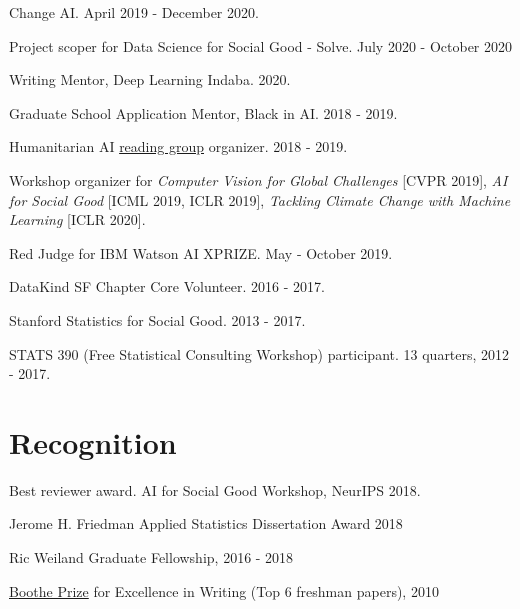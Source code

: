 \documentclass[letterpaper]{article}
\renewenvironment{itemize}{
  \begin{list}{}{
    \setlength{\leftmargin}{1.5em}
  }
}{
  \end{list}
}
\begin{document}
\begin{itemize}
{Change AI}. April 2019 - December 2020.
\item Project scoper for Data Science for Social Good - Solve. July 2020 - October 2020
\item Writing Mentor, Deep Learning Indaba. 2020.
\item Graduate School Application Mentor, Black in AI. 2018 - 2019.
\item Humanitarian AI \href{https://krisrs1128.github.io/Humanitarian-AI/}{reading group} organizer. 2018 - 2019.
\item Workshop organizer for \textit{Computer Vision for Global Challenges}
  [CVPR 2019], \textit{AI for Social Good} [ICML 2019, ICLR 2019],
  \textit{Tackling Climate Change with Machine Learning} [ICLR 2020].
\item Red Judge for IBM Watson AI XPRIZE. May - October 2019.
\item DataKind SF Chapter Core Volunteer. 2016 - 2017.
\item Stanford Statistics for Social Good. 2013 - 2017.
\item STATS 390 (Free Statistical Consulting Workshop) participant. 13 quarters, 2012 - 2017.
\end{itemize}

\section*{Recognition}
\begin{itemize}
\item Best reviewer award. AI for Social Good Workshop, NeurIPS 2018.
\item Jerome H. Friedman Applied Statistics Dissertation Award 2018
\item Ric Weiland Graduate Fellowship, 2016 - 2018
\item \href{https://undergrad.stanford.edu/programs/pwr/publications-prizes-and-awards/boothe-prize-essays}{Boothe Prize} for Excellence in Writing (Top 6 freshman papers), 2010
\end{itemize}
\end{document}
